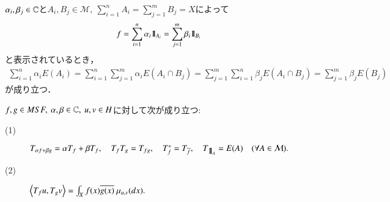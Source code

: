 	\begin{prf}
			$\alpha_i ,\beta_j \in \mathbb{C}$と$A_i,B_j \in \mathcal{M},\ \sum_{i=1}^{n} A_i = \sum_{j=1}^{m} B_j = X$によって
			\begin{align}
				f = \sum_{i=1}^{n} \alpha_i \mbox{1}\hspace{-0.25em}\mbox{l}_{A_i} = \sum_{j=1}^{m} \beta_i \mbox{1}\hspace{-0.25em}\mbox{l}_{B_i}
			\end{align}
			と表示されているとき，
			\begin{align}
				\sum_{i=1}^{n} \alpha_i E(A_i)
				= \sum_{i=1}^{n} \sum_{j=1}^{m} \alpha_i E(A_i \cap B_j)
				= \sum_{j=1}^{m} \sum_{i=1}^{n} \beta_j E(A_i \cap B_j)
				= \sum_{j=1}^{m} \beta_j E(B_j)
			\end{align}
			が成り立つ．
		\QED
	\end{prf}
	
	\begin{screen}
		\begin{lem}
			$f,g \in MSF,\ \alpha,\beta \in \mathbb{C},\ u,v \in H$に対して次が成り立つ:
			\begin{description}
				\item[(1)] 
					$T_{\alpha f + \beta g} = \alpha T_f + \beta T_f,
						\quad T_f T_g = T_{fg},
						\quad T_f^* = T_{\overline{f}},
						\quad T_{\mbox{1}\hspace{-0.25em}\mbox{l}_A} = E(A) \quad (\forall A \in \mathcal{M}).$
				
				\item[(2)] 
					$\inprod<T_f u, T_g v> = \int_X f(x) \conj{g(x)}\ \mu_{u,v}(dx).$
			\end{description}
			\label{lem:MSF_properties_of_T_f}
		\end{lem}
	\end{screen}
	
